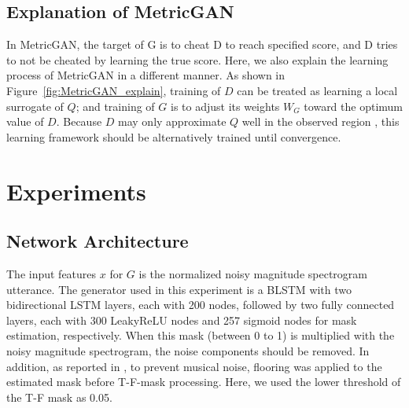 \documentclass{article}
\begin{document}
\subsection{Explanation of MetricGAN}
In MetricGAN, the target of G is to cheat D to reach specified score, and D tries to not be cheated by learning the true score. Here, we also explain the learning process of MetricGAN in a different manner. As shown in Figure~\ref{fig:MetricGAN_explain}, training of $D$ can be treated as learning a local surrogate of $Q$; and training of $G$ is to adjust its weights $W_G$ toward the optimum value of $D$. Because $D$ may only approximate $Q$ well in the observed region \cite{fu2019learning}, this learning framework should be alternatively trained until convergence. 

\section{Experiments}
\subsection{Network Architecture}
The input features $x$ for $G$ is the normalized noisy magnitude spectrogram utterance. The generator used in this experiment is a BLSTM \cite{weninger2015speech} with two bidirectional LSTM layers, each with 200 nodes, followed by two fully connected layers, each with 300 LeakyReLU nodes and 257 sigmoid nodes for mask estimation, respectively. When this mask (between 0 to 1) is multiplied with the noisy magnitude spectrogram, the noise components should be removed. In addition, as reported in \cite{koizumi2018dnn}, to prevent musical noise, flooring was applied to the estimated mask before T-F-mask processing. Here, we used the lower threshold of the T-F mask as 0.05. 
\end{document}
